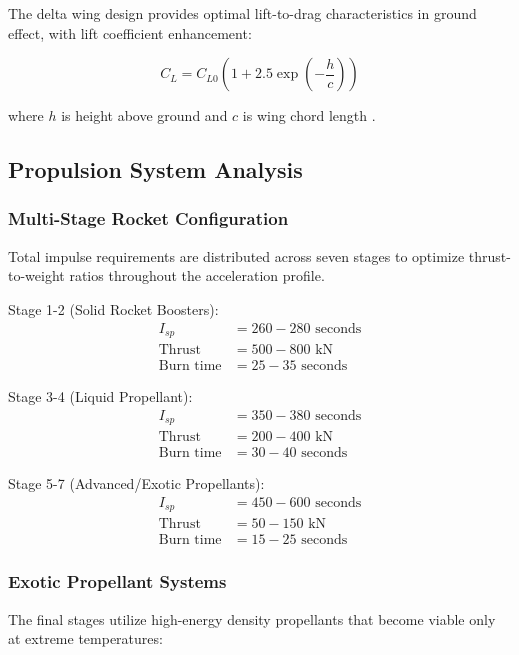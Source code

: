 \documentclass[12pt,a4paper]{article}
\begin{document}
The delta wing design provides optimal lift-to-drag characteristics in ground effect, with lift coefficient enhancement:

\begin{equation}
C_L = C_{L0} \left(1 + 2.5 \exp\left(-\frac{h}{c}\right)\right)
\label{eq:delta_wing_lift}
\end{equation}

where $h$ is height above ground and $c$ is wing chord length \cite{ahmed1983ground}.

\subsection{Propulsion System Analysis}

\subsubsection{Multi-Stage Rocket Configuration}
Total impulse requirements are distributed across seven stages to optimize thrust-to-weight ratios throughout the acceleration profile.

Stage 1-2 (Solid Rocket Boosters):
\begin{align}
I_{sp} &= 260-280 \text{ seconds} \\
\text{Thrust} &= 500-800 \text{ kN} \\
\text{Burn time} &= 25-35 \text{ seconds}
\end{align}

Stage 3-4 (Liquid Propellant):
\begin{align}
I_{sp} &= 350-380 \text{ seconds} \\
\text{Thrust} &= 200-400 \text{ kN} \\
\text{Burn time} &= 30-40 \text{ seconds}
\end{align}

Stage 5-7 (Advanced/Exotic Propellants):
\begin{align}
I_{sp} &= 450-600 \text{ seconds} \\
\text{Thrust} &= 50-150 \text{ kN} \\
\text{Burn time} &= 15-25 \text{ seconds}
\end{align}

\subsubsection{Exotic Propellant Systems}
The final stages utilize high-energy density propellants that become viable only at extreme temperatures:
\end{document}
